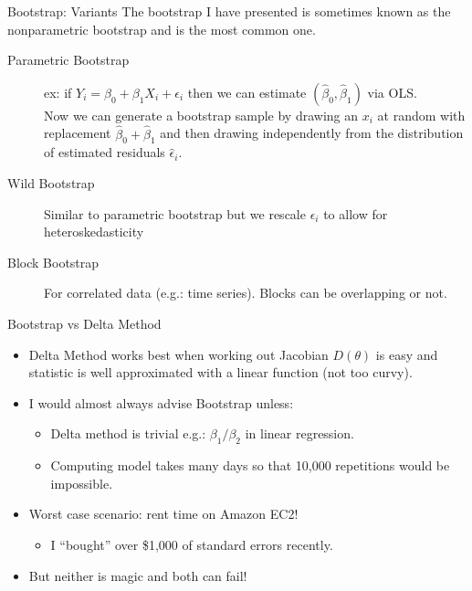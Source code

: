 \documentclass[aspectratio=169]{beamer}
\begin{document}
\begin{frame}{Bootstrap: Variants}
The bootstrap I have presented is sometimes known as the \alert{nonparametric bootstrap} and is the most common one.
\begin{description}
\item[Parametric Bootstrap] ex: if $Y_i = \beta_0 + \beta_1 X_i + \epsilon_i$ then we can estimate $(\hat{\beta}_0,\hat{\beta}_1)$ via OLS.\\
 Now we can generate a bootstrap sample by drawing an $x_i$ at random with replacement $\hat{\beta}_0 + \hat{\beta}_1$ and then drawing \alert{independently} from the distribution of estimated residuals $\hat{\epsilon}_i$.
 \item[Wild Bootstrap] Similar to parametric bootstrap but we rescale $\epsilon_i$ to allow for \alert{heteroskedasticity}
\item[Block Bootstrap] For correlated data (e.g.: time series). Blocks can be overlapping or not.  
\end{description}
\end{frame}

\begin{frame}{Bootstrap vs Delta Method}
\begin{itemize}
\item Delta Method works best when working out Jacobian $D(\theta)$ is easy and statistic is well approximated with a linear function (not too curvy).
\item I would almost always advise Bootstrap unless:
\begin{itemize}
\item Delta method is trivial e.g.: $\beta_1 / \beta_2$ in linear regression.
\item Computing model takes many days so that 10,000 repetitions would be impossible.
\end{itemize}
\item Worst case scenario: rent time on Amazon EC2!
\begin{itemize}
\item I ``bought'' over \$1,000 of standard errors recently.
\end{itemize}
\item But neither is magic and both can fail!
\end{itemize}
\end{frame}
\end{document}
